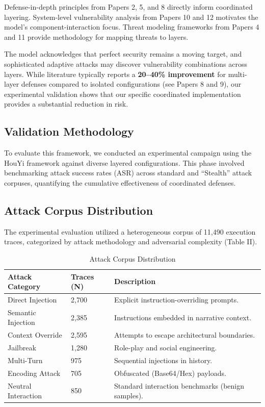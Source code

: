 \documentclass[conference]{IEEEtran}
\begin{document}
Defense-in-depth principles from Papers 2, 5, and 8 directly inform coordinated layering. System-level vulnerability analysis from Papers 10 and 12 motivates the model's component-interaction focus. Threat modeling frameworks from Papers 4 and 11 provide methodology for mapping threats to layers.

The model acknowledges that perfect security remains a moving target, and sophisticated adaptive attacks may discover vulnerability combinations across layers. While literature typically reports a \textbf{20--40\% improvement} for multi-layer defenses compared to isolated configurations (see Papers 8 and 9), our experimental validation shows that our specific coordinated implementation provides a substantial reduction in risk.

\subsection{Validation Methodology}
To evaluate this framework, we conducted an experimental campaign using the HouYi framework against diverse layered configurations. This phase involved benchmarking attack success rates (ASR) across standard and ``Stealth'' attack corpuses, quantifying the cumulative effectiveness of coordinated defenses.

\subsection{Attack Corpus Distribution}
The experimental evaluation utilized a heterogeneous corpus of 11,490 execution traces, categorized by attack methodology and adversarial complexity (Table II).

\begin{table}[htbp]
\caption{Attack Corpus Distribution}
\begin{center}
\begin{tabularx}{\columnwidth}{@{}l l X@{}}
\toprule
\textbf{Attack Category} & \textbf{Traces (N)} & \textbf{Description} \\ \midrule
Direct Injection & 2,700 & Explicit instruction-overriding prompts. \\
Semantic Injection & 2,385 & Instructions embedded in narrative context. \\
Context Override & 2,595 & Attempts to escape architectural boundaries. \\
Jailbreak & 1,280 & Role-play and social engineering. \\
Multi-Turn & 975 & Sequential injections in history. \\
Encoding Attack & 705 & Obfuscated (Base64/Hex) payloads. \\
Neutral Interaction & 850 & Standard interaction benchmarks (benign samples). \\ \bottomrule
\end{tabularx}
\end{center}
\end{table}
\end{document}
